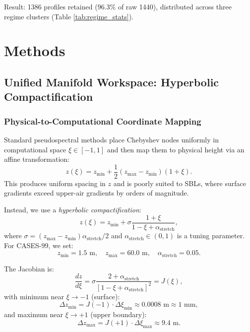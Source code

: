 \documentclass[11pt,a4paper]{article}
\begin{document}
Result: 1386 profiles retained ($96.3\%$ of raw 1440), distributed across three regime clusters (Table \ref{tab:regime_stats}).

\section{Methods}
\label{sec:methods}

\subsection{Unified Manifold Workspace: Hyperbolic Compactification}
\label{sec:methods:manifold}

\subsubsection{Physical-to-Computational Coordinate Mapping}

Standard pseudospectral methods place Chebyshev nodes uniformly in computational space $\xi \in [-1, 1]$ and then map them to physical height via an affine transformation:
\begin{equation}
z(\xi) = z_{\mathrm{min}} + \frac{1}{2}(z_{\mathrm{max}} - z_{\mathrm{min}})(1 + \xi).
\end{equation}
This produces uniform spacing in $z$ and is poorly suited to SBLs, where surface gradients exceed upper-air gradients by orders of magnitude.

Instead, we use a \emph{hyperbolic compactification}:
\begin{equation}
z(\xi) = z_{\mathrm{min}} + \sigma \frac{1 + \xi}{1 - \xi + \alpha_{\mathrm{stretch}}},
\label{eq:hyperbolic}
\end{equation}
where $\sigma = (z_{\mathrm{max}} - z_{\mathrm{min}}) \alpha_{\mathrm{stretch}} / 2$ and $\alpha_{\mathrm{stretch}} \in (0, 1)$ is a tuning parameter. For CASES-99, we set:
\begin{equation}
z_{\mathrm{min}} = 1.5 \text{ m}, \quad z_{\mathrm{max}} = 60.0 \text{ m}, \quad \alpha_{\mathrm{stretch}} = 0.05.
\end{equation}

The Jacobian is:
\begin{equation}
\frac{dz}{d\xi} = \sigma \frac{2 + \alpha_{\mathrm{stretch}}}{[1 - \xi + \alpha_{\mathrm{stretch}}]^2} = J(\xi),
\label{eq:jacobian}
\end{equation}
with minimum near $\xi \to -1$ (surface):
\begin{equation}
\Delta z_{\min} = J(-1) \cdot \Delta \xi_{\min} \approx 0.0008 \text{ m} \approx 1 \text{ mm},
\end{equation}
and maximum near $\xi \to +1$ (upper boundary):
\begin{equation}
\Delta z_{\max} = J(+1) \cdot \Delta \xi_{\max} \approx 9.4 \text{ m}.
\end{equation}
\end{document}
